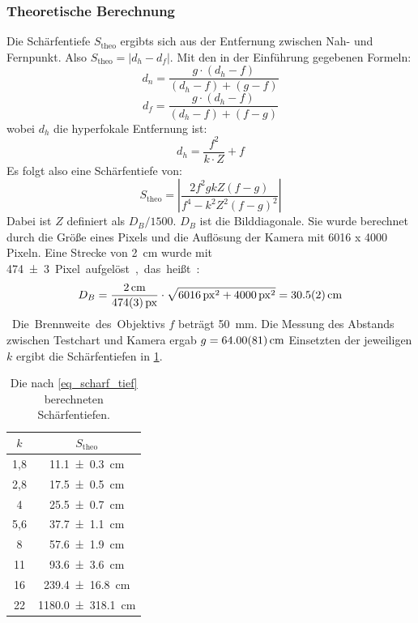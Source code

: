 \documentclass[
	a4paper,
	12pt,
	pagesize,
	ngerman
]{scrartcl}
\begin{document}
	\subsubsection*{Theoretische Berechnung}
	Die Schärfentiefe $S_\text{theo}$ ergibts sich aus der Entfernung zwischen Nah- und Fernpunkt.
	Also $S_\text{theo}= |d_h - d_f|$.
	Mit den in der Einführung gegebenen Formeln: %
	\begin{equation}
		d_n = \frac{g\cdot (d_h-f)}{(d_h-f)+(g-f)}
	\end{equation}
	\begin{equation}
		d_f = \frac{g\cdot (d_h - f)}{(d_h-f)+(f-g)}
	\end{equation}
	wobei $d_h$ die hyperfokale Entfernung ist:
	\begin{equation}
		d_h = \frac{f^2}{k\cdot Z} + f
	\end{equation}
	Es folgt also eine Schärfentiefe von:
	\begin{equation}
		S_\text{theo} = \left| \frac{2f^2 g k Z (f-g)}{f^4-k^2 Z^2 (f-g)^2} \right|
		\label{eq_scharf_tief}
	\end{equation}
	Dabei ist $Z$ definiert als $D_B/1500$. 
	$D_B$ ist die Bilddiagonale. 
	Sie wurde berechnet durch die Größe eines Pixels und die Auflösung der Kamera mit 6016 x 4000 Pixeln.
	Eine Strecke von \SI{2}{cm} wurde mit \SI{474+-3} Pixel aufgelöst, das heißt:
	\begin{equation}
		D_B = \frac{\SI{2}{cm}}{\SI{474+-3}{px}}\cdot \sqrt{\SI{6016}{px}^2+\SI{4000}{px}^2} = \SI{30,5+-0,2}{cm}
	\end{equation}
	Die Brennweite des Objektivs $f$ beträgt \SI{50}{mm}.
	Die Messung des Abstands zwischen Testchart und Kamera ergab $g=\SI{64+-0,81}{cm}$
	Einsetzten der jeweiligen $k$ ergibt die Schärfentiefen in \cref{tab_theo_scharf_tief}.

	\begin{table}[H]
		\centering
		\begin{tabular}{ c | c }
			$k$ & $S_\text{theo}$ \\ \hline
			1,8 & \SI{11,1 +- 0,3}{cm} \\
			2,8 & \SI{17,5 +- 0,5}{cm} \\
			4 & \SI{25,5 +- 0,7}{cm} \\
			5,6 & \SI{37,7 +- 1,1}{cm} \\
			8 & \SI{57,6 +- 1,9}{cm} \\
			11 & \SI{93,6 +- 3,6}{cm} \\
			16 & \SI{239,4 +- 16,8}{cm} \\
			22 & \SI{1180,0 +- 318,1}{cm} \\
		\end{tabular}
		\caption{Die nach \cref{eq_scharf_tief} berechneten Schärfentiefen. } %
		\label{tab_theo_scharf_tief} 
	\end{table}
\end{document}
